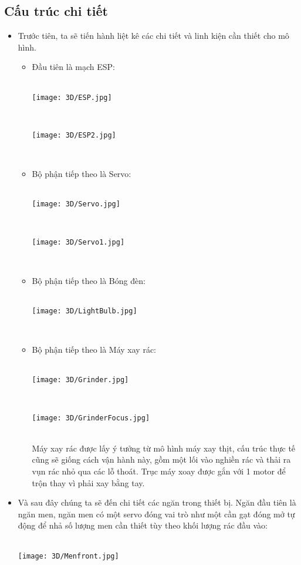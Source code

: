 \documentclass[12pt, a4paper]{article}
\begin{document}
\subsection{Cấu trúc chi tiết}
\begin{itemize}
    \item Trước tiên, ta sẽ tiến hành liệt kê các chi tiết và linh kiện cần thiết cho mô hình.
    \begin{itemize}
        \item Đầu tiên là mạch ESP: \\ \\
        \centerline{\texttt{[image: 3D/ESP.jpg]}} \\ 
        \centerline{\texttt{[image: 3D/ESP2.jpg]}} \\ 
        \item Bộ phận tiếp theo là Servo: \\ \\
        \centerline{\texttt{[image: 3D/Servo.jpg]}} \\ 
        \centerline{\texttt{[image: 3D/Servo1.jpg]}} \\ 
        \item Bộ phận tiếp theo là Bóng đèn: \\ \\
        \centerline{\texttt{[image: 3D/LightBulb.jpg]}} \\ 
        \item Bộ phận tiếp theo là Máy xay rác: \\ \\
        \centerline{\texttt{[image: 3D/Grinder.jpg]}} \\ 
        \centerline{\texttt{[image: 3D/GrinderFocus.jpg]}} \\
        \textnormal{Máy xay rác được lấy ý tưởng từ mô hình máy xay thịt, cấu trúc thực tế cũng sẽ giống cách vận hành này, gồm một lối vào nghiền rác và thải ra vụn rác nhỏ qua các lỗ thoát. Trục máy xoay được gắn với 1 motor để trộn thay vì phải xay bằng tay.}
    \end{itemize}
    \item Và sau đây chúng ta sẽ đến chi tiết các ngăn trong thiết bị. Ngăn đầu tiên là ngăn men, ngăn men có một servo đóng vai trò như một cần gạt đóng mở tự động để nhả số lượng men cần thiết tùy theo khối lượng rác đầu vào: \\ \\ 
    \centerline{\texttt{[image: 3D/Menfront.jpg]}} \\ \\

\end{itemize}
\end{document}
